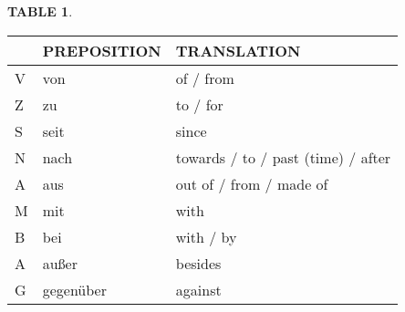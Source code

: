\documentclass[a4paper,twocolumn,10pt]{article}
\newtheorem{mytable}{TABLE}[section]
\begin{document}
\begin{table-bg}[width=\linewidth]{}

	\begin{table-title}[width=6.5cm]{}
		\captionsetup{labelformat=empty}
	\end{table-title}

	\begin{table-theword}
		\footnotesize \begin{mytable}\label{table:prepositions_dative} \end{mytable}
	\end{table-theword}

	\begin{table-content}
	\begin{tabularx}{\textwidth}{l|XX}

		& PREPOSITION & TRANSLATION \\

		\midrule

		\cellcolor{gray-light} V&
		\cellcolor{white} von &
		\cellcolor{white} of / from \\

		\cellcolor{gray-light} Z&
		\cellcolor{white} zu &
		\cellcolor{white} to / for \\


		\cellcolor{gray-light} S&
		\cellcolor{white} seit &
		\cellcolor{white} since \\


		\cellcolor{gray-light} N&
		\cellcolor{white} nach &
		\cellcolor{white} towards / to / past (time) / after\\


		\cellcolor{gray-light} A&
		\cellcolor{white} aus &
		\cellcolor{white} out of / from / made of \\


		\cellcolor{gray-light} M&
		\cellcolor{white} mit &
		\cellcolor{white} with\\


		\cellcolor{gray-light} B&
		\cellcolor{white} bei &
		\cellcolor{white}  with / by\\


		\cellcolor{gray-light} A&
		\cellcolor{white} außer &
		\cellcolor{white}  besides\\


		\cellcolor{gray-light} G&
		\cellcolor{white} gegenüber &
		\cellcolor{white} against \\


	\end{tabularx}
	\end{table-content}


\end{table-bg}
\end{document}
